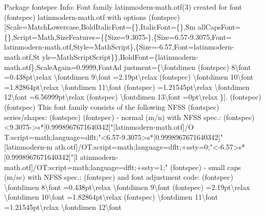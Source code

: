 \documentclass[
  letterpaper,
  DIV=11,
  numbers=noendperiod]{scrartcl}
\newenvironment{Shaded}{\begin{snugshade}}{\end{snugshade}}
\newcommand{\NormalTok}[1]{\textcolor[rgb]{0.00,0.23,0.31}{#1}}
\begin{document}
\begin{Shaded}
\begin{Highlighting}[]
\NormalTok{Package fontspec Info: Font family \textquotesingle{}latinmodern{-}math.otf(3)\textquotesingle{} created for font}
\NormalTok{(fontspec)             \textquotesingle{}latinmodern{-}math.otf\textquotesingle{} with options}
\NormalTok{(fontspec)             [Scale=MatchLowercase,BoldItalicFont=\{\},ItalicFont=\{\},Sm}
\NormalTok{allCapsFont=\{\},Script=Math,SizeFeatures=\{\{Size=9.3075{-}\},\{Size=6.57{-}9.3075,Font=}
\NormalTok{latinmodern{-}math.otf,Style=MathScript\},\{Size={-}6.57,Font=latinmodern{-}math.otf,St}
\NormalTok{yle=MathScriptScript\}\},BoldFont=\{latinmodern{-}math.otf\},ScaleAgain=0.9999,FontAd}
\NormalTok{justment=\{\textbackslash{}fontdimen}
\NormalTok{(fontspec)             8\textbackslash{}font =0.438pt\textbackslash{}relax \textbackslash{}fontdimen 9\textbackslash{}font =2.19pt\textbackslash{}relax}
\NormalTok{(fontspec)             \textbackslash{}fontdimen 10\textbackslash{}font =1.82864pt\textbackslash{}relax \textbackslash{}fontdimen 11\textbackslash{}font}
\NormalTok{(fontspec)             =1.21545pt\textbackslash{}relax \textbackslash{}fontdimen 12\textbackslash{}font =6.56999pt\textbackslash{}relax}
\NormalTok{(fontspec)             \textbackslash{}fontdimen 13\textbackslash{}font =0pt\textbackslash{}relax \}].}
\NormalTok{(fontspec)              }
\NormalTok{(fontspec)              This font family consists of the following NFSS}
\NormalTok{(fontspec)             series/shapes:}
\NormalTok{(fontspec)              }
\NormalTok{(fontspec)             {-} \textquotesingle{}normal\textquotesingle{} (m/n) with NFSS spec.:}
\NormalTok{(fontspec)             \textless{}9.3075{-}\textgreater{}s*[0.9998967671640342]"[latinmodern{-}math.otf]/O}
\NormalTok{T:script=math;language=dflt;"\textless{}6.57{-}9.3075\textgreater{}s*[0.9998967671640342]"[latinmodern{-}m}
\NormalTok{ath.otf]/OT:script=math;language=dflt;+ssty=0;"\textless{}{-}6.57\textgreater{}s*[0.9998967671640342]"[l}
\NormalTok{atinmodern{-}math.otf]/OT:script=math;language=dflt;+ssty=1;"}
\NormalTok{(fontspec)             {-} \textquotesingle{}small caps\textquotesingle{}  (m/sc) with NFSS spec.: }
\NormalTok{(fontspec)             and font adjustment code:}
\NormalTok{(fontspec)             \textbackslash{}fontdimen 8\textbackslash{}font =0.438pt\textbackslash{}relax \textbackslash{}fontdimen 9\textbackslash{}font}
\NormalTok{(fontspec)             =2.19pt\textbackslash{}relax \textbackslash{}fontdimen 10\textbackslash{}font =1.82864pt\textbackslash{}relax}
\NormalTok{(fontspec)             \textbackslash{}fontdimen 11\textbackslash{}font =1.21545pt\textbackslash{}relax \textbackslash{}fontdimen 12\textbackslash{}font}

\end{Highlighting}
\end{Shaded}
\end{document}
